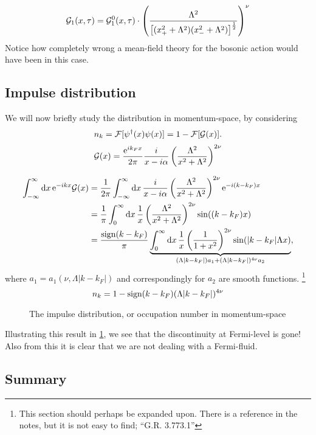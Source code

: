 \begin{equation}
\mathcal{G}_1(x, \tau) = \mathcal{G}_1^0(x, \tau)\cdot\left(\frac{\Lambda^2}{\left[(x_+^2+\Lambda^2)(x_-^2+\Lambda^2)\right]^{\frac12}}\right)^\nu
\end{equation}
Notice how completely wrong a mean-field theory for the bosonic action would have been in this case.

\subsection{Impulse distribution} %
We will now briefly study the distribution in momentum-space, by considering
\begin{equation*}
n_k = \mathcal{F}[\psi^\dagger(x)\psi(x)] = 1-\mathcal{F}[\mathcal{G}(x)].
\end{equation*}
\[\mathcal{G}(x) = \frac{\mathrm{e}^{ik_Fx}}{2\pi}\frac{i}{x-i\alpha}\left(\frac{\Lambda^2}{x^2+\Lambda^2}\right)^{2\nu}\]

\begin{align*}
\int_{-\infty}^\infty\dd{x}\mathrm{e}^{-ikx}\mathcal{G}(x) &= \frac{1}{2\pi}\int_{-\infty}^\infty\dd{x}\frac{i}{x-i\alpha}\left(\frac{\Lambda^2}{x^2+\Lambda^2}\right)^{2\nu}\mathrm{e}^{-i(k-k_F)x} \\
&= \frac{1}{\pi}\int_0^\infty\dd{x}\frac{1}{x}\left(\frac{\Lambda^2}{x^2+\Lambda^2}\right)^{2\nu}\sin((k-k_F)x)\\
&= \frac{\text{sign}(k-k_F)}{\pi}\underbrace{\int_0^\infty\dd{x}\frac1x\left(\frac{1}{1+x^2}\right)^{2\nu}\sin(|k-k_F|\Lambda x)}_{(\Lambda|k-k_F|)a_1 + (\Lambda|k-k_F|)^{4\nu}a_2},
\end{align*}
where \(a_1 = a_1(\nu, \Lambda|k-k_F|)\) and correspondingly for \(a_2\) are smooth functions. \footnote{This section should perhaps be expanded upon. There is a reference in the notes, but it is not easy to find; ``G.R. 3.773.1''}
\begin{equation}
n_k = 1-\text{sign}(k-k_F)(\Lambda|k-k_F|)^{4\nu}
\end{equation}
\begin{figure}
	\centering
	
	\caption{The impulse distribution, or occupation number in momentum-space}
	\label{fig:occupation_k}
\end{figure}
Illustrating this result in \cref{fig:occupation_k}, we see that the discontinuity at Fermi-level is gone! Also from this it is clear that we are not dealing with a Fermi-fluid.

\subsection{Summary} %

